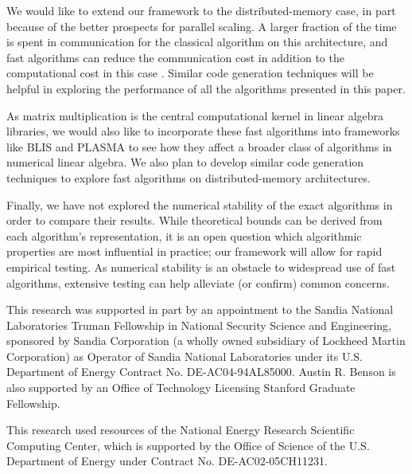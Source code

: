 \documentclass[preprint]{sigplanconf}
\begin{document}
We would like to extend our framework to the distributed-memory case, in part because of the better prospects for parallel scaling.
A larger fraction of the time is spent in communication for the classical algorithm on this architecture, and fast algorithms can reduce the communication cost in addition to the computational cost in this case \cite{ballard2012communication}.
Similar code generation techniques will be helpful in exploring the performance of all the algorithms presented in this paper.

As matrix multiplication is the central computational kernel in linear algebra libraries, we would also like to incorporate these fast algorithms into frameworks like BLIS \cite{BLIS1} and PLASMA \cite{kurzak2013multithreading} to see how they affect a broader class of algorithms in numerical linear algebra.
We also plan to develop similar code generation techniques to explore fast algorithms on distributed-memory architectures.

Finally, we have not explored the numerical stability of the exact algorithms in order to compare their results.
While theoretical bounds can be derived from each algorithm's  representation, it is an open question which algorithmic properties are most influential in practice; our framework will allow for rapid empirical testing.
As numerical stability is an obstacle to widespread use of fast algorithms, extensive testing can help alleviate (or confirm) common concerns.



\acks

This research was supported in part by an appointment to the Sandia National Laboratories Truman Fellowship in National Security Science and Engineering, sponsored by Sandia Corporation (a wholly owned subsidiary of Lockheed Martin Corporation) as Operator of Sandia National Laboratories under its U.S. Department of Energy Contract No. DE-AC04-94AL85000.
Austin R. Benson is also supported by an Office of Technology Licensing Stanford Graduate Fellowship.

This research used resources of the National Energy Research Scientific Computing Center, which is supported by the Office of Science of the U.S. Department of Energy under Contract No. DE-AC02-05CH11231.






\end{document}
